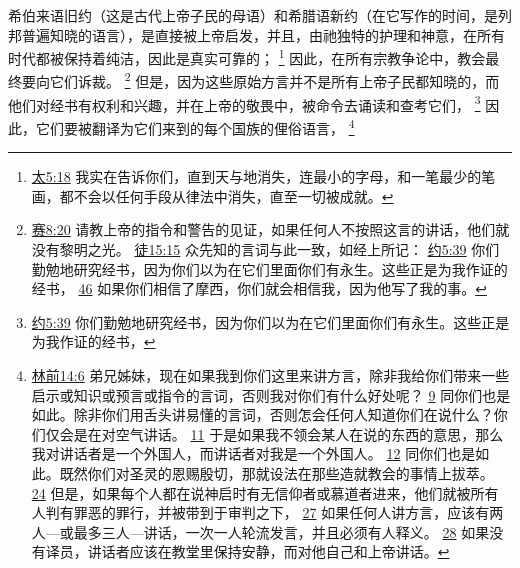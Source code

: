 \documentclass[12pt, a4paper, oneside]{ctexart}
\newcounter{parnum}[section]
\newcommand{\N}{%
   \noindent\refstepcounter{parnum}%
    \makebox[\parindent][l]{\textbf{\arabic{parnum}.}}}
\begin{document}
\N 希伯来语旧约（这是古代上帝子民的母语）和希腊语新约（在它写作的时间，是列邦普遍知晓的语言），是直接被上帝启发，并且，由祂独特的护理和神意，在所有时代都被保持着纯洁，因此是真实可靠的；
	\footnote {
		\href{https://biblehub.com/matthew/5-18.htm}{太5:18} 我实在告诉你们，直到天与地消失，连最小的字母，和一笔最少的笔画，都不会以任何手段从律法中消失，直至一切被成就。
	}
	因此，在所有宗教争论中，教会最终要向它们诉裁。
	\footnote {
		\href{https://biblehub.com/isaiah/8-20.htm}{赛8:20} 请教上帝的指令和警告的见证，如果任何人不按照这言的讲话，他们就没有黎明之光。
		\href{https://biblehub.com/acts/15-15.htm}{徒15:15} 众先知的言词与此一致，如经上所记：
		\href{https://biblehub.com/john/5-39.htm}{约5:39} 你们勤勉地研究经书，因为你们以为在它们里面你们有永生。这些正是为我作证的经书，
		\href{https://biblehub.com/john/5-46.htm}{46} 如果你们相信了摩西，你们就会相信我，因为他写了我的事。
	}
	但是，因为这些原始方言并不是所有上帝子民都知晓的，而他们对经书有权利和兴趣，并在上帝的敬畏中，被命令去诵读和查考它们，
	\footnote {
		\href{https://biblehub.com/john/5-39.htm}{约5:39} 你们勤勉地研究经书，因为你们以为在它们里面你们有永生。这些正是为我作证的经书，
	}
	因此，它们要被翻译为它们来到的每个国族的俚俗语言，
	\footnote {
		\href{https://biblehub.com/1_corinthians/14-6.htm}{林前14:6} 弟兄姊妹，现在如果我到你们这里来讲方言，除非我给你们带来一些启示或知识或预言或指令的言词，否则我对你们有什么好处呢？
		\href{https://biblehub.com/1_corinthians/14-9.htm}{9} 同你们也是如此。除非你们用舌头讲易懂的言词，否则怎会任何人知道你们在说什么？你们仅会是在对空气讲话。
		\href{https://biblehub.com/1_corinthians/14-11.htm}{11} 于是如果我不领会某人在说的东西的意思，那么我对讲话者是一个外国人，而讲话者对我是一个外国人。
		\href{https://biblehub.com/1_corinthians/14-12.htm}{12} 同你们也是如此。既然你们对圣灵的恩赐殷切，那就设法在那些造就教会的事情上拔萃。
		\href{https://biblehub.com/1_corinthians/14-24.htm}{24} 但是，如果每个人都在说神启时有无信仰者或慕道者进来，他们就被所有人判有罪恶的罪行，并被带到于审判之下，
		\href{https://biblehub.com/1_corinthians/14-27.htm}{27} 如果任何人讲方言，应该有两人---或最多三人---讲话，一次一人轮流发言，并且必须有人释义。
		\href{https://biblehub.com/1_corinthians/14-28.htm}{28} 如果没有译员，讲话者应该在教堂里保持安静，而对他自己和上帝讲话。
	}
\end{document}
